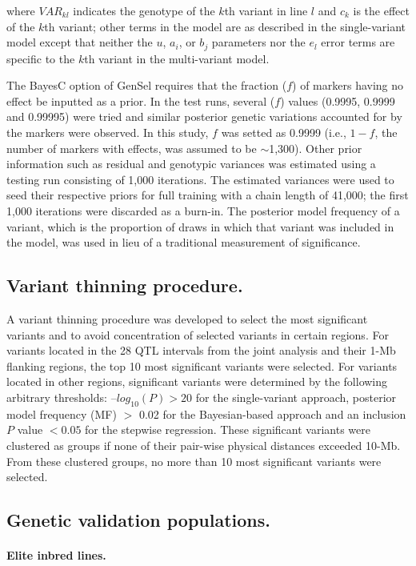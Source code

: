 \documentclass[10pt,letterpaper]{article}
\begin{document}
where $VAR_{kl}$ indicates the genotype of the $k$th variant in line $l$ and $c_k$ is the effect of the $k$th variant; other terms in the model are as described in the single-variant model except that neither the $u$, $a_i$, or $b_j$ parameters nor the $e_l$ error terms are specific to the $k$th variant in the multi-variant model. 

The BayesC option of GenSel requires that the fraction ($f$) of markers having no effect be inputted as a prior. In the test runs, several ($f$) values (0.9995, 0.9999 and 0.99995) were tried and similar posterior genetic variations accounted for by the markers were observed. In this study, $f$ was setted as 0.9999 (i.e., $1 - f$, the number of markers with effects, was assumed to be $\sim$1,300). Other prior information such as residual and genotypic variances was estimated using a testing run consisting of 1,000 iterations. The estimated variances were used to seed their respective priors for full training with a chain length of 41,000; the first 1,000 iterations were discarded as a burn-in. The posterior model frequency of a variant, which is the proportion of draws in which that variant was included in the model, was used in lieu of a traditional measurement of significance.

\subsection*{Variant thinning procedure.}
A variant thinning procedure was developed to select the most significant variants and to avoid concentration of selected variants in certain regions. For variants located in the 28 QTL intervals from the joint analysis and their 1-Mb flanking regions, the top 10 most significant variants were selected. For variants located in other regions, significant variants were determined by the following arbitrary thresholds: $–log_{10}(P) > 20$ for the single-variant approach, posterior model frequency (MF) $>$ 0.02 for the Bayesian-based approach and an inclusion $P$ value $< 0.05$ for the stepwise regression. These significant variants were clustered as groups if none of their pair-wise physical distances exceeded 10-Mb. From these clustered groups, no more than 10 most significant variants were selected.        

\subsection*{Genetic validation populations.} 
\paragraph{Elite inbred lines.}
\end{document}
